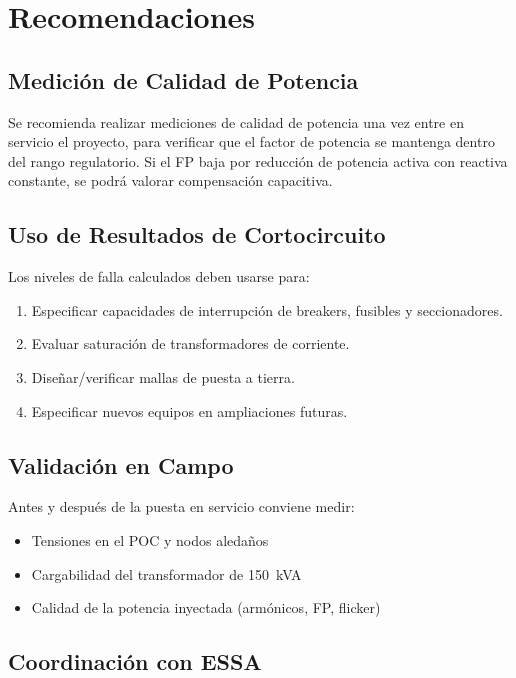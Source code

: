 \section{Recomendaciones}

\subsection{Medición de Calidad de Potencia}

Se recomienda realizar mediciones de calidad de potencia una vez entre en servicio el proyecto, para verificar que el factor de potencia se mantenga dentro del rango regulatorio. Si el FP baja por reducción de potencia activa con reactiva constante, se podrá valorar compensación capacitiva.

\subsection{Uso de Resultados de Cortocircuito}

Los niveles de falla calculados deben usarse para:

\begin{enumerate}
    \item Especificar capacidades de interrupción de breakers, fusibles y seccionadores.
    \item Evaluar saturación de transformadores de corriente.
    \item Diseñar/verificar mallas de puesta a tierra.
    \item Especificar nuevos equipos en ampliaciones futuras.
\end{enumerate}

\subsection{Validación en Campo}

Antes y después de la puesta en servicio conviene medir:

\begin{itemize}
    \item Tensiones en el POC y nodos aledaños
    \item Cargabilidad del transformador de 150~kVA
    \item Calidad de la potencia inyectada (armónicos, FP, flicker)
\end{itemize}

\subsection{Coordinación con ESSA}

